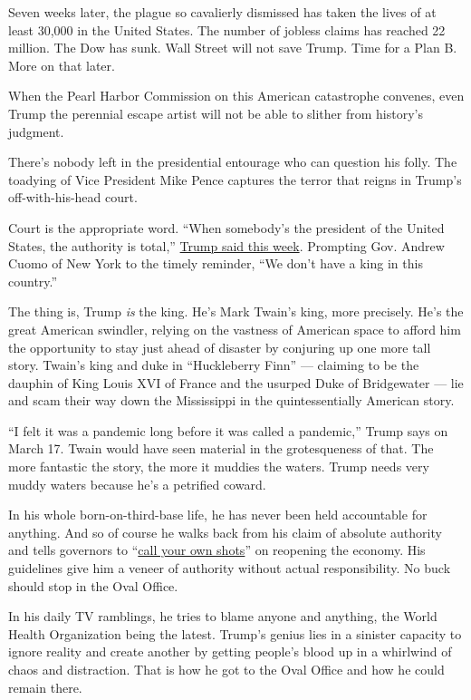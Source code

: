 Seven weeks later, the plague so cavalierly dismissed has taken the
lives of at least 30,000 in the United States. The number of jobless
claims has reached 22 million. The Dow has sunk. Wall Street will not
save Trump. Time for a Plan B. More on that later.

When the Pearl Harbor Commission on this American catastrophe convenes,
even Trump the perennial escape artist will not be able to slither from
history's judgment.

There's nobody left in the presidential entourage who can question his
folly. The toadying of Vice President Mike Pence captures the terror
that reigns in Trump's off-with-his-head court.

Court is the appropriate word. ``When somebody's the president of the
United States, the authority is total,''
\href{https://www.nytimes.com/2020/04/13/us/politics/trump-coronavirus-governors.html}{Trump
said this week}. Prompting Gov. Andrew Cuomo of New York to the timely
reminder, ``We don't have a king in this country.''

The thing is, Trump \emph{is} the king. He's Mark Twain's king, more
precisely. He's the great American swindler, relying on the vastness of
American space to afford him the opportunity to stay just ahead of
disaster by conjuring up one more tall story. Twain's king and duke in
``Huckleberry Finn'' --- claiming to be the dauphin of King Louis XVI of
France and the usurped Duke of Bridgewater --- lie and scam their way
down the Mississippi in the quintessentially American story.

``I felt it was a pandemic long before it was called a pandemic,'' Trump
says on March 17. Twain would have seen material in the grotesqueness of
that. The more fantastic the story, the more it muddies the waters.
Trump needs very muddy waters because he's a petrified coward.

In his whole born-on-third-base life, he has never been held accountable
for anything. And so of course he walks back from his claim of absolute
authority and tells governors to
``\href{https://www.cnn.com/2020/04/16/politics/donald-trump-reopening-guidelines-coronavirus/index.html}{call
your own shots}'' on reopening the economy. His guidelines give him a
veneer of authority without actual responsibility. No buck should stop
in the Oval Office.

In his daily TV ramblings, he tries to blame anyone and anything, the
World Health Organization being the latest. Trump's genius lies in a
sinister capacity to ignore reality and create another by getting
people's blood up in a whirlwind of chaos and distraction. That is how
he got to the Oval Office and how he could remain there.

